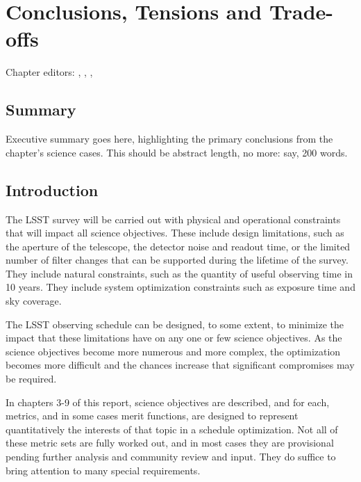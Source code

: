 \chapter[Conclusions]{Conclusions, Tensions and Trade-offs}
\def\chpname{tradeoffs}\label{chp:\chpname}

Chapter editors:
,
,
,

\section*{Summary}

Executive summary goes here, highlighting the primary conclusions from
the chapter's science cases. This should be abstract length, no more:
say, 200 words.


\section{Introduction}

The LSST survey will be carried out with physical and operational
constraints that will impact all science objectives.  These include
design limitations, such as the aperture of the telescope, the detector 
noise and readout time, or the limited number of filter changes that 
can be supported during the lifetime of the survey.  They include 
natural constraints, such as the quantity of useful observing time 
in 10 years. They include system optimization constraints such as 
exposure time and sky coverage. 

The LSST observing schedule can be designed, to some extent, to minimize
the impact that these limitations have on any one or few science
objectives. As the science objectives become more numerous and more
complex, the optimization becomes more difficult and the chances
increase that significant compromises may be required.

In chapters 3-9 of this report, science objectives are described, and
for each, metrics, and in some cases merit functions, are designed to
represent quantitatively the interests of that topic in a schedule
optimization.  Not all of these metric sets are fully worked out, and in
most cases they are provisional pending further analysis and community
review and input.  They do suffice to bring attention to many special
requirements.

